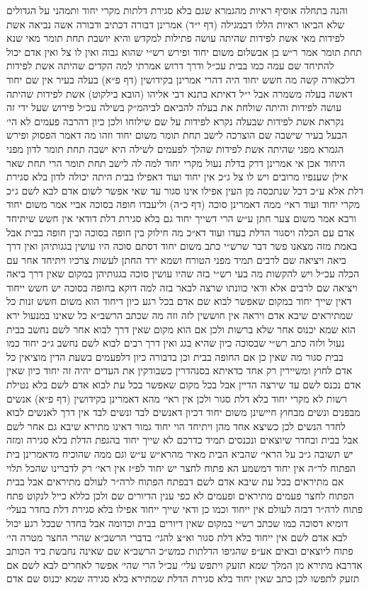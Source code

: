 \documentclass[12pt, openany]{book}
\begin{document}
\begin{multicols}{2}
והנה בתחלה אוסיף ראיות מהגמרא שגם בלא סגירת דלתות מקרי יחוד ותמהני על הגדולים שלא הביאו ראיות הללו דבמגילה (דף י״ד) אמרינן דבורה דכתיב ודבורה אשה נביאה אשת לפידות מאי אשת לפידות שהיתה עושה פתילות למקדש והיא יושבת תחת תומר מאי שנא תחת תומר אמר ר״ש בן אבשלום משום יחוד ופירש רש״י שהוא גבוה ואין לו צל ואין אדם יכול להתיחד שם עמה כמו בבית עכ״ל ודרך דרוש אמרתי למה הקדים שהיתה אשת לפידות דלכאורה קשה מה חשש יחוד היה דהרי אמרינן בקידושין (דף פ״א) בעלה בעיר אין שם יחוד דאשה בעלה משמרה אבל י״ל דאיתא בתנא דבי אליהו (הובא בילקוט) אשת לפידות שהיתה עושה לפידות והיתה שולחת את בעלה להביאם לביהמ״ק בשילה עכ״ל פירוש שעל ידי זה נקראת אשת לפידות שבעלה נקרא לפידות על שם שילוחו ולכן כיון דהרבה פעמים לא הי׳ הבעל בעיר שישבה שם הוצרכה לישב תחת תומר משום יחוד וזהו מה דאמר הפסוק ופירש הגמרא מפני שהיתה אשת לפידות שהלך לפעמים לשילה היא ישבה תחת תומר לדון מפני היחוד אכן אי אמרינן דרק בדלת נעול מקרי יחוד למה לה לישב תחת תומר הרי תחת שאר אילן שענפיו מרובים ויש לו צל ג״כ אין יחוד ועוד דאפילו בבית היתה יכולה לדון בלא סגירת דלת אלא ע״כ דכל שנתכסה מן העין אפילו אינו סגור עד שאי אפשר לשום אדם לבא לשם ג״כ מקרי יחוד ועוד ראי׳ ממה דאמרינן סוכה (דף כ״ה) וליעבדו חופה בסוכה אביי אמר משום יחוד ורבא אמר משום צער חתן ע״ש הרי דשייך יחוד גם בלא סגירת דלת דודאי אין חשש שיתיחד אדם עם הכלה ויסגור הדלת בעדו ועוד דא״כ מה חילוק בין חופה בסוכה ובין חופה בבית אבל באמת מזה מצאנו פשר דבר שרש״י כתב משום יחוד דסתם סוכה היו עושין בגגותיהן ואין דרך ביאה ויציאה שם לרבים תמיד מפני הטורח ושמא ירד החתן לעשות צרכיו ויתיחד אחר עם הכלה עכ״ל ויש להקשות מה בעי רש״י בזה שהיו עושין סוכה בגגותיהן במקום שאין דרך ביאה ויציאה שם לרבים אלא ודאי כוונתו שרצה לבאר בזה למה דוקא בחופה בסוכה יש חשש ייחוד דאין שייך יחוד במקום שאפשר לבוא שם אדם בכל רגע כיון דיחוד הוא משום חשש זנות כל שמתיראים שיבא אדם ויראה אין חוששין לזה וזה מה שכתב הרשב״א כל שאינו במנעול ירא הוא שמא יכנוס אחר שלא ברשות ולכן אם הוא מקום שאין דרך לבוא אחר לשם נחשב כבית נעול ולזה כתב רש״י שבסוכה כיון שהיא בגג ואין דרך רבים לבוא לשם נחשב ג״כ יחוד כמו בבית סגור מה שאין כן אם החופה בבית וכן בדבורה כיון דלפעמים בשעת הדין מוציאין כל אדם לחוץ ומשיירין רק אחד כדאיתא בסנהדרין כשבודקין את העדים יהיה זה יחוד כיון שאין אדם נכנס לשם עד שירצה הדיין אבל בכל מקום שאפשר בכל עת לבוא אדם לשם בלא נטילת רשות לא מקרי יחוד בלא דלת סגור ולכן אין ראי׳ מהא דאמרינן בקידושין (דף פ״א) אנשים מבפנים ונשים מבחוץ חיישינן משום יחוד דכיון דאנשים לבד ונשים לבד אין דרך לאנשים לבוא לחדר הנשים לכן כשיצא אחד מהן ויתיחד הוי יחוד גמור דאינו מתירא שיבא גם אחר לשם אבל בבית ובחדר שיוצאים ונכנסים תמיד כדרכם לא שייך יחוד בהגפת הדלת בלא סגירה ומזה יש תשובה ג״כ על הראי׳ שהביא הבית מאיר מהרא״ש ע״ש וגם ממה שהוכיח מדאמרינן בית הפתוח לר״ה אין יחוד דמשמע הא פתוח לחצר יש יחוד לפ״ז אין ראי׳ רק לדברינו שהכל תלוי אם מתיראים בכל עת שיבא אדם לשם דבפתח הפתוח לרה״ר לעולם מתיראים אבל בבית הפתוח לחצר פעמים מתיראים ופעמים לא כפי ענין הדיורים שם ולכן כללא כייל לנקוט פתח פתוח לרה״ר דבזה לעולם אין ייחוד וכמו כן ודאי שייך ייחוד אפילו בלא סגירת דלת בחדר בעלי׳ דומיא דסוכה כמו שכתב רש״י במקום שאין דיורים בבית וכדומה אבל בחדר שבכל רגע יכול לבא אדם לשם אין ייחוד בלא דלת סגור וא״צ להגי׳ בדברי הרשב״א שהרי החצר מטרה הי׳ פתוח ליוצאים ובאים אע״פ שהגיפו הדלתות כמש״כ הרשב״א שם שאינה נחבשת ביד הכותב אדרבא מתירא מן המלך שמא תזעק ויתפש עלי׳ עכ״ל הרי שהי׳ אפשר לאחרים לבא לשם אם תזעק לתפשו לכן כתב שאין יחוד בלא סגירת הדלת שמתירא בלא סגירה שמא יכנוס שם אדם 
\end{multicols}
\end{document}
